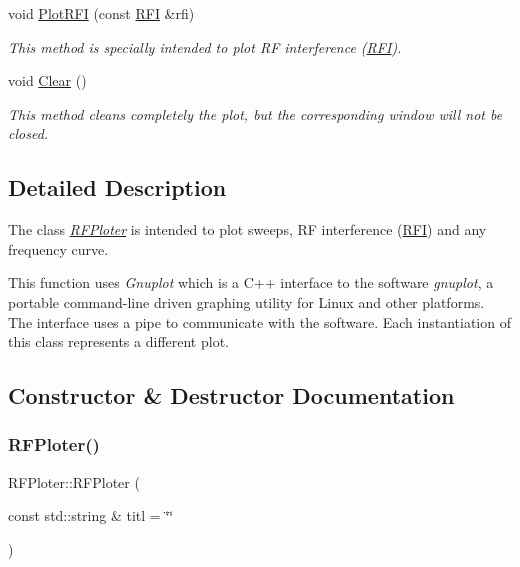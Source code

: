 \begin{DoxyCompactItemize}
void \hyperlink{classRFPloter_a18c4a6bfa7b41a799b9d808b8341b43c}{Plot\+R\+FI} (const \hyperlink{structRFI}{R\+FI} \&rfi)
\begin{DoxyCompactList}\small\item\em This method is specially intended to plot RF interference (\hyperlink{structRFI}{R\+FI}). \end{DoxyCompactList}\item 
\mbox{\label{classRFPloter_aff3f4c8c339120aa9394c5fea4f41edc}} 
void \hyperlink{classRFPloter_aff3f4c8c339120aa9394c5fea4f41edc}{Clear} ()
\begin{DoxyCompactList}\small\item\em This method cleans completely the plot, but the corresponding window will not be closed. \end{DoxyCompactList}\end{DoxyCompactItemize}


\subsection{Detailed Description}
The class {\itshape \hyperlink{classRFPloter}{R\+F\+Ploter}} is intended to plot sweeps, RF interference (\hyperlink{structRFI}{R\+FI}) and any frequency curve. 

This function uses {\itshape Gnuplot} which is a C++ interface to the software {\itshape gnuplot}, a portable command-\/line driven graphing utility for Linux and other platforms. The interface uses a pipe to communicate with the software. Each instantiation of this class represents a different plot. 

\subsection{Constructor \& Destructor Documentation}
\mbox{\label{classRFPloter_ab7b36c6de3e288b7ab88238b16a0816a}} 
\subsubsection{\texorpdfstring{R\+F\+Ploter()}{RFPloter()}}
{\footnotesize\ttfamily R\+F\+Ploter\+::\+R\+F\+Ploter (\begin{DoxyParamCaption}\item[{const std\+::string \&}]{titl = {\ttfamily \char`\"{}\char`\"{}} }\end{DoxyParamCaption})\hspace{0.3cm}{\ttfamily [inline]}}



